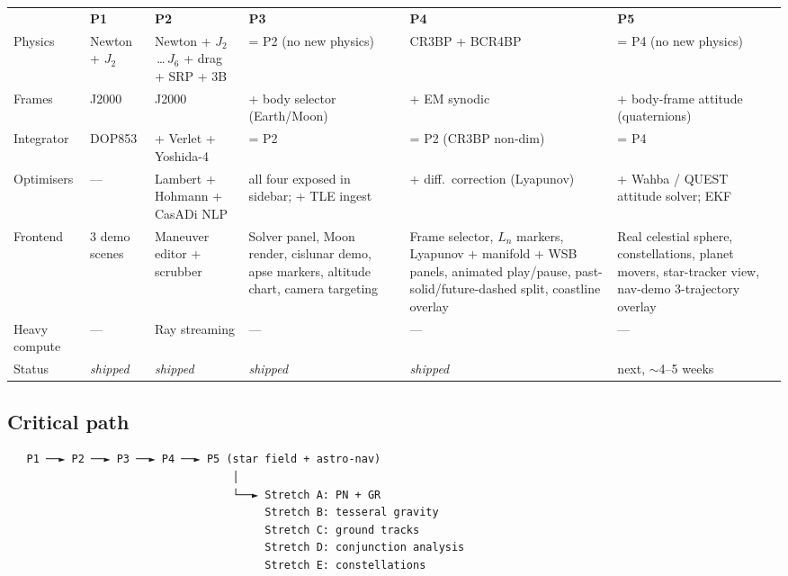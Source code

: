 \documentclass[11pt, a4paper]{article}
\begin{document}
\begin{center}
\begin{tabularx}{\textwidth}{L{2.6cm} X X X X X}
    & \color{white}\textbf{P1}
    & \color{white}\textbf{P2}
    & \color{white}\textbf{P3}
    & \color{white}\textbf{P4}
    & \color{white}\textbf{P5} \\
  Physics
    & Newton + $J_2$
    & Newton + $J_2$\,\dots\,$J_6$ + drag + SRP + 3B
    & = P2 (no new physics)
    & CR3BP + BCR4BP
    & = P4 (no new physics) \\
  Frames
    & J2000
    & J2000
    & + body selector (Earth/Moon)
    & + EM synodic
    & + body-frame attitude (quaternions) \\
  Integrator
    & DOP853
    & + Verlet + Yoshida-4
    & = P2
    & = P2 (CR3BP non-dim)
    & = P4 \\
  Optimisers
    & ---
    & Lambert + Hohmann + CasADi NLP
    & all four exposed in sidebar; + TLE ingest
    & + diff.\ correction (Lyapunov)
    & + Wahba / QUEST attitude solver; EKF \\
  Frontend
    & 3 demo scenes
    & Maneuver editor + scrubber
    & Solver panel, Moon render, cislunar demo, apse markers, altitude chart, camera targeting
    & Frame selector, $L_n$ markers, Lyapunov + manifold + WSB panels, animated play/pause, past-solid/future-dashed split, coastline overlay
    & Real celestial sphere, constellations, planet movers, star-tracker view, nav-demo 3-trajectory overlay \\
  Heavy compute
    & ---
    & Ray streaming
    & ---
    & ---
    & --- \\
  Status
    & \emph{shipped}
    & \emph{shipped}
    & \emph{shipped}
    & \emph{shipped}
    & next, $\sim$4--5 weeks \\
\end{tabularx}
\end{center}

\subsection{Critical path}

\begin{center}
\begin{minipage}{0.85\textwidth}
\begin{verbatim}
   P1 ──► P2 ──► P3 ──► P4 ──► P5 (star field + astro-nav)
                                   │
                                   └──► Stretch A: PN + GR
                                        Stretch B: tesseral gravity
                                        Stretch C: ground tracks
                                        Stretch D: conjunction analysis
                                        Stretch E: constellations
\end{verbatim}
\end{minipage}
\end{center}
\end{document}
